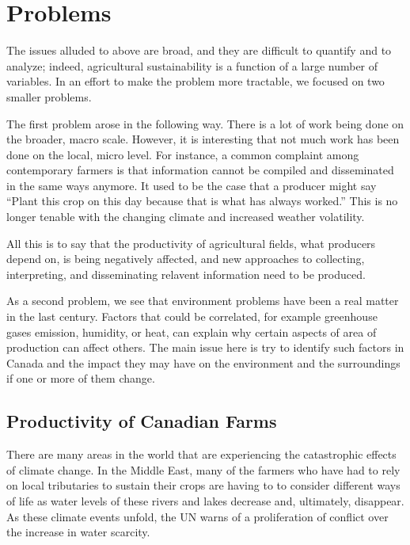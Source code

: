 \documentclass[11pt]{article}
\numberwithin{equation}{section}
\begin{document}
 
\section{Problems}\label{problems}

The issues alluded to above are broad, and they are difficult to quantify and to analyze; indeed, agricultural sustainability is a function of a large number of variables. In an effort to make the problem more tractable, we focused on two smaller problems.

The first problem arose in the following way. There is a lot of work being done on the broader, macro scale. However, it is interesting that not much work has been done on the local, micro level. For instance, a common complaint among contemporary farmers is that information cannot be compiled and disseminated in the same ways anymore. It used to be the case that a producer might say ``Plant this crop on this day because that is what has always worked.'' This is no longer tenable with the changing climate and increased weather volatility.

All this is to say that the productivity of agricultural fields, what producers depend on, is being negatively affected, and new approaches to collecting, interpreting, and disseminating relavent information need to be produced.

As a second problem, we see that environment problems  have been a real matter in the last century. Factors that could be correlated, for example greenhouse gases emission, humidity, or heat, can explain why certain aspects of area of production can affect others. The main issue here is try to identify  such factors in  Canada and the impact they may have on the environment and the surroundings if one or more of them change. 


\subsection{Productivity of Canadian Farms}\label{productivity}

There are many areas in the world that are experiencing the catastrophic effects of climate change. In the Middle East, many of the farmers who have had to rely on local tributaries to sustain their crops are having to to consider different ways of life as water levels of these rivers and lakes decrease and, ultimately, disappear. As these climate events unfold, the UN \cite{UN} warns of a proliferation of conflict over the increase in water scarcity.
\end{document}
